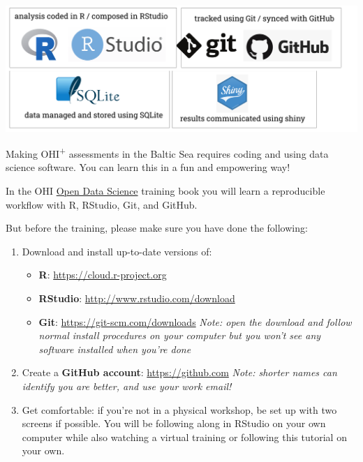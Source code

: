\documentclass[
]{book}
\providecommand{\tightlist}{%
  \setlength{\itemsep}{0pt}\setlength{\parskip}{0pt}}
\begin{document}
\begin{center}\includegraphics[width=800px]{_book/_main_files/figure-html/tech-toolkit} \end{center}

Making OHI\textsuperscript{+} assessments in the Baltic Sea requires coding and using data science software.
You can learn this in a fun and empowering way!

In the OHI \href{http://ohi-science.org/data-science-training/}{Open Data Science} training book you will learn a reproducible workflow with R, RStudio, Git, and GitHub.

But before the training, please make sure you have done the following:

\begin{enumerate}
\def\labelenumi{\arabic{enumi})}
\tightlist
\item
  Download and install up-to-date versions of:

  \begin{itemize}
  \tightlist
  \item
    \textbf{R}: \url{https://cloud.r-project.org}
  \item
    \textbf{RStudio}: \url{http://www.rstudio.com/download}
  \item
    \textbf{Git}: \url{https://git-scm.com/downloads} \emph{Note: open the download and follow normal install procedures on your computer but you won't see any software installed when you're done}
  \end{itemize}
\item
  Create a \textbf{GitHub account}: \url{https://github.com} \emph{Note: shorter names can identify you are better, and use your work email!}
\item
  Get comfortable: if you're not in a physical workshop, be set up with two screens if possible. You will be following along in RStudio on your own computer while also watching a virtual training or following this tutorial on your own.
\end{enumerate}
\end{document}
